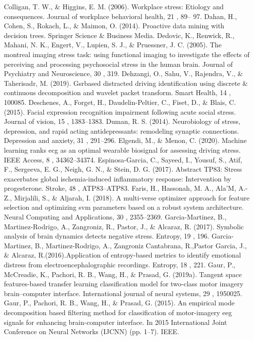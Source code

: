 Colligan, T. W., \& Higgins, E. M. (2006). Workplace stress: Etiology and consequences. Journal of workplace behavioral health, 21 , 89– 97.
Dahan, H., Cohen, S., Rokach, L., \& Maimon, O. (2014). Proactive data mining with decision trees. Springer Science \& Business Media.
Dedovic, K., Renwick, R., Mahani, N. K., Engert, V., Lupien, S. J., \& Pruessner, J. C. (2005). The montreal imaging stress task: using functional imaging to investigate the effects of perceiving and processing psychosocial stress in the human brain. Journal of Psychiatry and Neuroscience, 30 , 319.
Dehzangi, O., Sahu, V., Rajendra, V., \& Taherisadr, M. (2019). Gsrbased distracted driving identification using discrete \& continuous decomposition and wavelet packet transform. Smart Health, 14 , 100085.
Deschenes, A., Forget, H., Daudelin-Peltier, C., Fiset, D., \& Blais, C. (2015). Facial expression recognition impairment following acute social stress. Journal of vision, 15 , 1383–1383.
Duman, R. S. (2014). Neurobiology of stress, depression, and rapid acting antidepressants: remodeling synaptic connections. Depression and anxiety, 31 , 291–296.
Elgendi, M., \& Menon, C. (2020). Machine learning ranks ecg as an optimal wearable biosignal for assessing driving stress. IEEE Access, 8 , 34362–34374.
Espinosa-Garcia, C., Sayeed, I., Yousuf, S., Atif, F., Sergeeva, E. G., Neigh, G. N., \& Stein, D. G. (2017). Abstract TP83: Stress exacerbates global ischemia-induced inflammatory response: Intervention by progesterone. Stroke, 48 , ATP83–ATP83.
Faris, H., Hassonah, M. A., Ala’M, A.-Z., Mirjalili, S., \& Aljarah, I. (2018). A multi-verse optimizer approach for feature selection and optimizing svm parameters based on a robust system architecture. Neural Computing and Applications, 30 , 2355–2369.
Garcia-Martinez, B., Martinez-Rodrigo, A., Zangroniz, R., Pastor, J., \& Alcaraz, R. (2017). Symbolic analysis of brain dynamics detects negative stress. Entropy, 19 , 196.
Garcia-Martinez, B., Martinez-Rodrigo, A., Zangroniz Cantabrana, R.,Pastor Garcia, J., \& Alcaraz, R.(2016).Application of entropy-based metrics to identify emotional distress from electroencephalographic recordings. Entropy, 18 , 221.
Gaur, P., McCreadie, K., Pachori, R. B., Wang, H., \& Prasad, G. (2019a). Tangent space features-based transfer learning classification model for two-class motor imagery brain–computer interface. International journal of neural systems, 29 , 1950025.
Gaur, P., Pachori, R. B., Wang, H., \& Prasad, G. (2015). An empirical mode decomposition based filtering method for classification of motor-imagery eeg signals for enhancing brain-computer interface. In 2015 International Joint Conference on Neural Networks (IJCNN) (pp. 1–7). IEEE.
